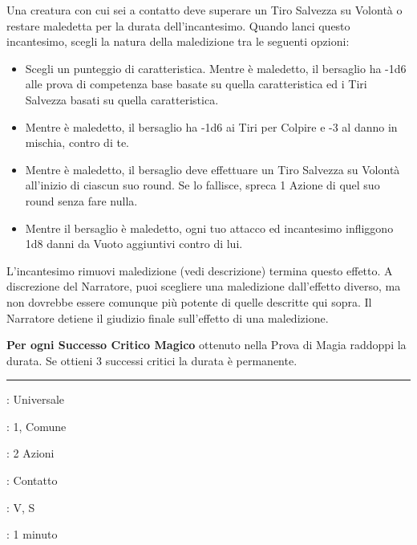 \begin{multicols}{2}
Una creatura con cui sei a contatto deve superare un Tiro Salvezza su Volontà o restare maledetta per la durata dell'incantesimo. Quando lanci questo incantesimo, scegli la natura della maledizione tra le seguenti opzioni:

\begin{itemize}[leftmargin=*] \setlength{\itemsep}{0pt}
	\item Scegli un punteggio di caratteristica. Mentre è maledetto, il bersaglio ha -1d6 alle prova di competenza base basate su quella caratteristica ed i Tiri Salvezza basati su quella caratteristica.
	\item Mentre è maledetto, il bersaglio ha -1d6 ai Tiri per Colpire e -3 al danno in mischia, contro di te.
	\item Mentre è maledetto, il bersaglio deve effettuare un Tiro Salvezza su Volontà all'inizio di ciascun suo round. Se lo fallisce, spreca 1 Azione di quel suo round senza fare nulla.
	\item Mentre il bersaglio è maledetto, ogni tuo attacco ed incantesimo infliggono 1d8 danni da Vuoto aggiuntivi contro di lui.
\end{itemize}

L'incantesimo rimuovi maledizione (vedi descrizione) termina questo effetto. A discrezione del Narratore, puoi scegliere una maledizione dall'effetto diverso, ma non dovrebbe essere comunque più potente di quelle descritte qui sopra. Il Narratore detiene il giudizio finale sull'effetto di una maledizione.

\textbf{Per ogni Successo Critico Magico} ottenuto nella Prova di Magia raddoppi la durata. Se ottieni 3 successi critici la durata è permanente.

\smallskip\noindent\rule{\linewidth}{2pt} \hypertarget{Scagliare Maledizione Minore}{}\smallskip{}
\noindent
\begin{description}[noitemsep, topsep=0pt, parsep=0pt, partopsep=0pt, leftmargin=0cm, labelwidth=2.8cm]
	\item[\textbf{Lista di Magia}]: Universale
	\item[\textbf{Livello}]: 1, Comune
	\item[\textbf{T. di Lancio}]: 2 Azioni
	\item[\textbf{Gittata}]: Contatto
	\item[\textbf{Componenti}]: V, S
	\item[\textbf{Durata}]: 1 minuto
\end{description}


\end{multicols}
